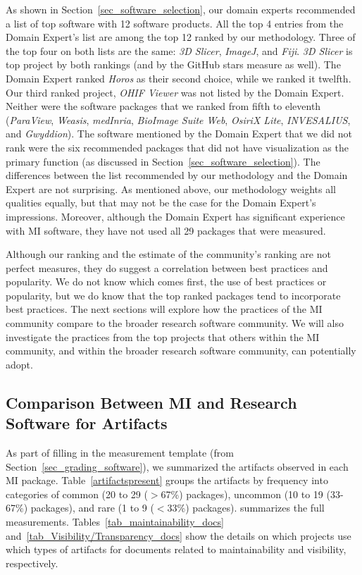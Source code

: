 \documentclass[11pt]{article}
\begin{document}
As shown in Section~\ref{sec_software_selection}, our domain experts recommended
a list of top software with 12 software products.  All the top 4 entries from
the Domain Expert's list are among the top 12 ranked by our methodology. Three
of the top four on both lists are the same: \textit{3D Slicer}, \textit{ImageJ},
and \textit{Fiji}. \textit{3D Slicer} is top project by both rankings (and by
the GitHub stars measure as well).  The Domain Expert ranked \textit{Horos} as
their second choice, while we ranked it twelfth.  Our third ranked project,
\textit{OHIF Viewer} was not listed by the Domain Expert.  Neither were the
software packages that we ranked from fifth to eleventh (\textit{ParaView},
\textit{Weasis}, \textit{medInria}, \textit{BioImage Suite Web}, \textit{OsiriX
Lite}, \textit{INVESALIUS}, and \textit{Gwyddion}).  The software mentioned by
the Domain Expert that we did not rank were the six recommended packages that
did not have visualization as the primary function (as discussed in
Section~\ref{sec_software_selection}).  The differences between the list
recommended by our methodology and the Domain Expert are not surprising.  As
mentioned above, our methodology weights all qualities equally, but that may not
be the case for the Domain Expert's impressions.  Moreover, although the Domain
Expert has significant experience with MI software, they have not used all 29
packages that were measured.

Although our ranking and the estimate of the community's ranking are not perfect
measures, they do suggest a correlation between best practices and popularity.
We do not know which comes first, the use of best practices or popularity, but
we do know that the top ranked packages tend to incorporate best practices. The
next sections will explore how the practices of the MI community compare to the
broader research software community. We will also investigate the practices from
the top projects that others within the MI community, and within the broader
research software community, can potentially adopt.

\subsection{Comparison Between MI and Research Software for Artifacts}
\label{Sec_CompareArtifacts}

As part of filling in the measurement template (from
Section~\ref{sec_grading_software}), we summarized the artifacts observed in
each MI package. Table~\ref{artifactspresent} groups the artifacts by frequency
into categories of common (20 to 29 ($>$67\%) packages), uncommon (10 to 19
(33-67\%) packages), and rare (1 to 9 ($<$33\%) packages). \citet{Dong2021-Data}
summarizes the full measurements.  Tables~\ref{tab_maintainability_docs}
and~\ref{tab_Visibility/Transparency_docs} show the details on which projects
use which types of artifacts for documents related to maintainability and
visibility, respectively.
\end{document}
